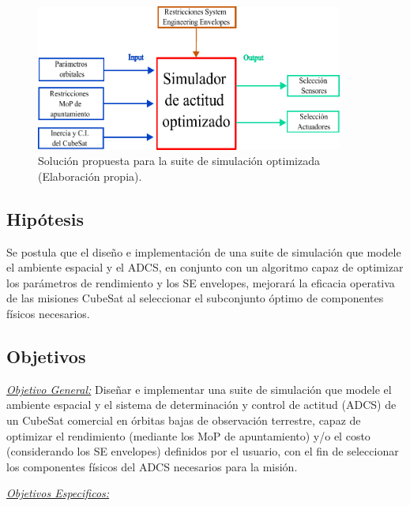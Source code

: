\begin{figure}[h]
	\centering    
	\includegraphics[width=0.9\textwidth]{bloque02.pdf}
	\caption{Solución propuesta para la suite de simulación optimizada (Elaboración propia).}
	\label{fig:bloques02}
\end{figure}

\subsection{Hipótesis}
Se postula que el diseño e implementación de una suite de simulación que modele el ambiente espacial y el ADCS, en conjunto con un algoritmo capaz de optimizar los parámetros de rendimiento y los SE envelopes, mejorará la eficacia operativa de las misiones CubeSat al seleccionar el subconjunto óptimo de componentes físicos necesarios.

\subsection{Objetivos}
\textit{\underline{Objetivo General:}} Diseñar e implementar una suite de simulación que modele el ambiente espacial y el sistema de determinación y control de actitud (ADCS) de un CubeSat comercial en órbitas bajas de observación terrestre, capaz de optimizar el rendimiento (mediante los MoP de apuntamiento) y/o el costo (considerando los SE envelopes) definidos por el usuario, con el fin de seleccionar los componentes físicos del ADCS necesarios para la misión.

\textit{\underline{Objetivos Especificos:}}

